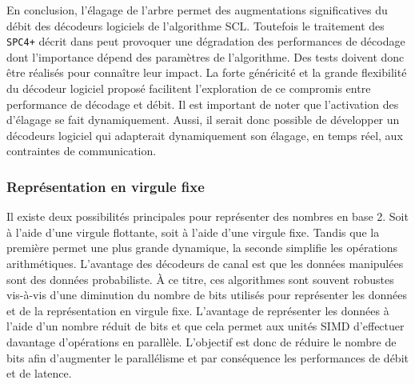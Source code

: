 En conclusion, l'élagage de l'arbre permet des augmentations significatives du débit des décodeurs logiciels de l'algorithme SCL. Toutefois le traitement des \noeuds \texttt{SPC4+} décrit dans \cite{sarkis_fast_2016} peut provoquer une dégradation des performances de décodage dont l'importance dépend des paramètres de l'algorithme. Des tests doivent donc être réalisés pour connaître leur impact. La forte généricité et la grande flexibilité du décodeur logiciel proposé facilitent l'exploration de ce compromis entre performance de décodage et débit. Il est important de noter que l'activation des \noeuds d'élagage se fait dynamiquement. Aussi, il serait donc possible de développer un décodeurs logiciel qui adapterait dynamiquement son élagage, en temps réel, aux contraintes de communication.

\subsubsection{Représentation en virgule fixe}

Il existe deux possibilités principales pour représenter des nombres en base 2. Soit à l'aide d'une virgule flottante, soit à l'aide d'une virgule fixe. Tandis que la première permet une plus grande dynamique, la seconde simplifie les opérations arithmétiques. L'avantage des décodeurs de canal est que les données manipulées sont des données probabiliste. \`A ce titre, ces algorithmes sont souvent robustes vis-à-vis d'une diminution du nombre de bits utilisés pour représenter les données et de la représentation en virgule fixe.
L'avantage de représenter les données à l'aide d'un nombre réduit de bits et que cela permet aux unités SIMD d'effectuer davantage d'opérations en parallèle. 
L'objectif est donc de réduire le nombre de bits afin d'augmenter le parallélisme et par conséquence les performances de débit et de latence.

